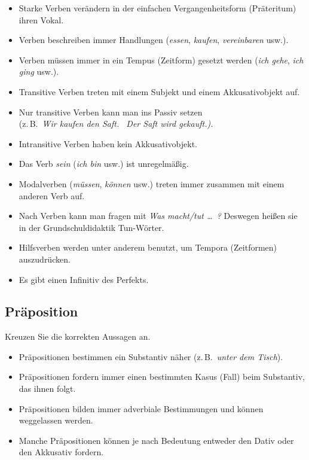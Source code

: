 \documentclass[12pt,a4paper,twoside]{article}
\newcommand{\FUHalbzeile}{\hspace{0.5\baselineskip}}
\newcommand{\FUHalbzeile}{}
\newcommand{\Lf}{
  \setlength{\itemsep}{1pt}
  \setlength{\parskip}{0pt}
  \setlength{\parsep}{0pt}
}
\begin{document}
\begin{itemize}[label=\Square]\Lf
  \item Starke Verben verändern in der einfachen Vergangenheitsform (Präteritum) ihren Vokal.
  \item Verben beschreiben immer Handlungen (\textit{essen}, \textit{kaufen}, \textit{vereinbaren} usw.).
  \item Verben müssen immer in ein Tempus (Zeitform) gesetzt werden (\textit{ich gehe}, \textit{ich ging} usw.).
  \item Transitive Verben treten mit einem Subjekt und einem Akkusativobjekt auf.
  \item Nur transitive Verben kann man ins Passiv setzen\\
    (z.\,B.\ \textit{Wir kaufen den Saft. \ Der Saft wird gekauft.).}
  \item Intransitive Verben haben kein Akkusativobjekt.
  \item Das Verb \textit{sein} (\textit{ich bin} usw.) ist unregelmäßig.
  \item Modalverben (\textit{müssen}, \textit{können} usw.) treten immer zusammen mit einem anderen Verb auf.
  \item Nach Verben kann man fragen mit \textit{Was macht\slash tut \ldots\ ?}
    Deswegen heißen sie in der Grundschuldidaktik Tun-Wörter.
  \item Hilfsverben werden unter anderem benutzt, um Tempora (Zeitformen) auszudrücken.
  \item Es gibt einen Infinitiv des Perfekts.
\end{itemize}

\FUHalbzeile

\subsection{Präposition}

Kreuzen Sie die korrekten Aussagen an.

\begin{itemize}[label=\Square]\Lf
  \item Präpositionen bestimmen ein Substantiv näher (z.\,B.\ \textit{unter dem Tisch}).
  \item Präpositionen fordern immer einen bestimmten Kasus (Fall) beim Substantiv, das ihnen folgt.
  \item Präpositionen bilden immer adverbiale Bestimmungen und können weggelassen werden.
  \item Manche Präpositionen können je nach Bedeutung entweder den Dativ oder den Akkusativ fordern.
\end{itemize}
\end{document}
